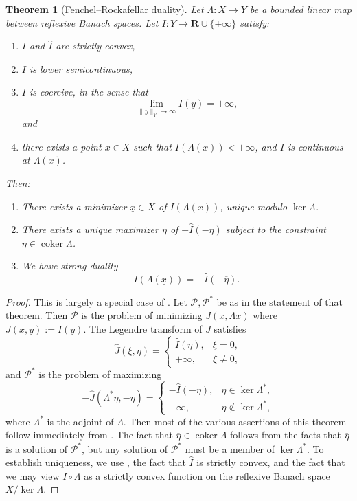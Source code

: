 \documentclass[reqno,11pt]{amsart}
\newcommand{\RR}{\mathbf{R}}
\DeclareMathOperator{\coker}{coker}
\newcommand{\dfn}[1]{\emph{#1}\index{#1}}
\newtheorem{theorem}{Theorem}[section]
\theoremstyle{definition}
\numberwithin{equation}{section}
\begin{document}
\begin{theorem}[Fenchel--Rockafellar duality]\label{abstract convex analysis}
Let $\Lambda : X \to Y$ be a bounded linear map between reflexive Banach spaces.
Let $I: Y \to \RR \cup \{+\infty\}$ satisfy:
\begin{enumerate}
\item $I$ and $\hat I$ are strictly convex,
\item $I$ is lower semicontinuous,
\item $I$ is \dfn{coercive}, in the sense that 
$$\lim_{\|y\|_Y \to \infty} I(y) = +\infty,$$
and
\item there exists a point $x \in X$ such that $I(\Lambda(x)) < +\infty$, and $I$ is continuous at $\Lambda(x)$.
\end{enumerate}
Then:
\begin{enumerate}
\item There exists a minimizer $\underline x \in X$ of $I(\Lambda(x))$, unique modulo $\ker \Lambda$.
\item There exists a unique maximizer $\overline \eta$ of $-\hat I(-\eta)$ subject to the constraint $\eta \in \coker \Lambda$.
\item We have \dfn{strong duality}
\begin{equation}\label{abstract strong duality}
I(\Lambda(\underline x)) = -\hat I(-\overline \eta).
\end{equation}
\end{enumerate}
\end{theorem}
\begin{proof}
This is largely a special case of \cite[Chapter IV, Theorem 4.2]{Ekeland99}.
Let $\mathscr P, \mathscr P^*$ be as in the statement of that theorem.
Then $\mathscr P$ is the problem of minimizing $J(x, \Lambda x)$ where $J(x, y) := I(y)$.
The Legendre transform of $J$ satisfies 
$$\hat J(\xi, \eta) = \begin{cases} \hat I(\eta), & \xi = 0, \\
	+\infty, &\xi \neq 0,
\end{cases}$$
and $\mathscr P^*$ is the problem of maximizing
$$-\hat J(\Lambda^* \eta, -\eta) = \begin{cases}
	-\hat I(-\eta), &\eta \in \ker \Lambda^*, \\
	-\infty, &\eta \notin \ker \Lambda^*,
\end{cases}$$
where $\Lambda^*$ is the adjoint of $\Lambda$.
Then most of the various assertions of this theorem follow immediately from \cite[Chapter IV, Theorem 4.2]{Ekeland99}.
The fact that $\overline \eta \in \coker \Lambda$ follows from the facts that $\overline \eta$ is a solution of $\mathscr P^*$, but any solution of $\mathscr P^*$ must be a member of $\ker \Lambda^*$. 
To establish uniqueness, we use \cite[Chapter II, Proposition 1.2]{Ekeland99}, the fact that $\hat I$ is strictly convex, and the fact that we may view $I \circ \Lambda$ as a strictly convex function on the reflexive Banach space $X/\ker \Lambda$.
\end{proof}
\end{document}
